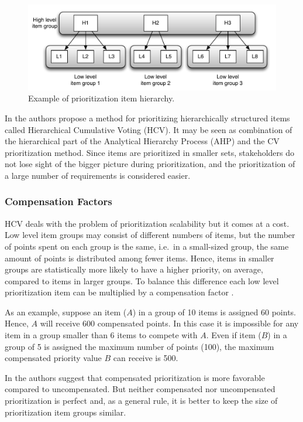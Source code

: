 \begin{figure}
	\center
\includegraphics[scale=0.45]{fig/hcv-example1}
\caption{\label{fig:Prionitization-Item-Hierarchy}Example of prioritization item hierarchy.}
\end{figure}

In \cite{Berander2006a} the authors propose a method for prioritizing hierarchically
structured items called Hierarchical Cumulative Voting (HCV). It may
be seen as combination of the hierarchical part of the Analytical Hierarchy
Process (AHP) \cite{Berander2005,Saaty1980a} and the CV prioritization method.
Since items are prioritized in smaller sets, stakeholders do not lose
sight of the bigger picture during prioritization, and the prioritization of a large number
of requirements is considered easier.

\subsubsection{Compensation Factors\label{sub:Compensation-factor}}
HCV deals with the problem of prioritization scalability but it comes
at a cost. Low level item groups may consist of different numbers of
items, but the number of points spent on each group is the same, i.e.\ in
a small-sized group, the same amount of points is distributed among fewer items.
Hence, items in smaller groups are statistically more likely to have a higher priority, on 
average, compared to items in larger groups. To balance this difference each low
level prioritization item can be multiplied by a compensation factor \cite{Berander2006a}.

As an example, suppose an item ($A$) in a
group of 10 items is assigned 60 points. Hence, $A$ will receive 600
compensated points. In this case it is impossible for any item in
a group smaller than 6 items to compete with $A$. Even if item ($B$) in
a group of 5 is assigned the maximum number of points (100), the maximum compensated
priority value $B$ can receive is 500.

In \cite{Berander2009a} the authors suggest that compensated prioritization is more favorable
compared to uncompensated. But neither compensated nor uncompensated prioritization
is perfect and, as a general rule, it is better to keep the size of
prioritization item groups similar.

